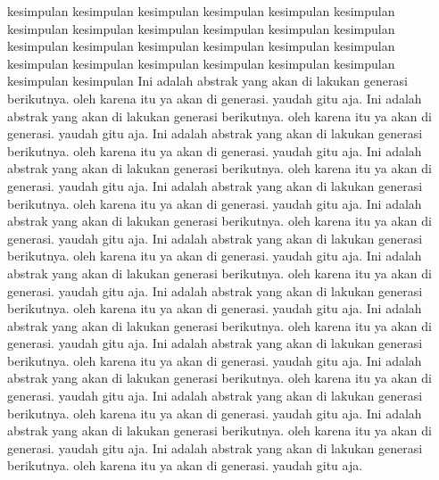 kesimpulan kesimpulan kesimpulan kesimpulan kesimpulan kesimpulan kesimpulan kesimpulan kesimpulan kesimpulan kesimpulan kesimpulan kesimpulan kesimpulan kesimpulan kesimpulan kesimpulan kesimpulan kesimpulan kesimpulan kesimpulan kesimpulan kesimpulan kesimpulan kesimpulan kesimpulan Ini adalah abstrak yang akan di lakukan generasi berikutnya. oleh karena itu ya akan di generasi. yaudah gitu aja. Ini adalah abstrak yang akan di lakukan generasi berikutnya. oleh karena itu ya akan di generasi. yaudah gitu aja. Ini adalah abstrak yang akan di lakukan generasi berikutnya. oleh karena itu ya akan di generasi. yaudah gitu aja. Ini adalah abstrak yang akan di lakukan generasi berikutnya. oleh karena itu ya akan di generasi. yaudah gitu aja. Ini adalah abstrak yang akan di lakukan generasi berikutnya. oleh karena itu ya akan di generasi. yaudah gitu aja. Ini adalah abstrak yang akan di lakukan generasi berikutnya. oleh karena itu ya akan di generasi. yaudah gitu aja. Ini adalah abstrak yang akan di lakukan generasi berikutnya. oleh karena itu ya akan di generasi. yaudah gitu aja. Ini adalah abstrak yang akan di lakukan generasi berikutnya. oleh karena itu ya akan di generasi. yaudah gitu aja. Ini adalah abstrak yang akan di lakukan generasi berikutnya. oleh karena itu ya akan di generasi. yaudah gitu aja. Ini adalah abstrak yang akan di lakukan generasi berikutnya. oleh karena itu ya akan di generasi. yaudah gitu aja. Ini adalah abstrak yang akan di lakukan generasi berikutnya. oleh karena itu ya akan di generasi. yaudah gitu aja. Ini adalah abstrak yang akan di lakukan generasi berikutnya. oleh karena itu ya akan di generasi. yaudah gitu aja. Ini adalah abstrak yang akan di lakukan generasi berikutnya. oleh karena itu ya akan di generasi. yaudah gitu aja. Ini adalah abstrak yang akan di lakukan generasi berikutnya. oleh karena itu ya akan di generasi. yaudah gitu aja. Ini adalah abstrak yang akan di lakukan generasi berikutnya. oleh karena itu ya akan di generasi. yaudah gitu aja.